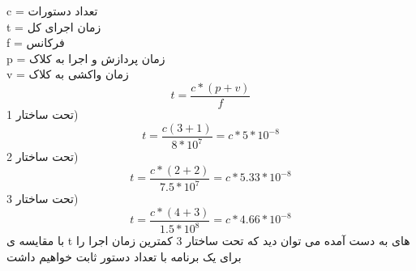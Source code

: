 c = تعداد دستورات\\
t = زمان اجرای کل\\
f = فرکانس\\
p = زمان پردازش و اجرا به کلاک\\
v = زمان واکشی به کلاک\\
\begin{equation*}
    t = \frac{c * (p + v)}{f}
\end{equation*}
تحت ساختار 1)\\
\begin{equation*}
    t = \frac{c ( 3 + 1)}{8 * 10^7} = c * 5 * 10^{-8} 
\end{equation*}
تحت ساختار 2)\\
\begin{equation*}
    t = \frac{c * (2 + 2)}{7.5 * 10^7} = c * 5.33 * 10^{-8}
\end{equation*}
تحت ساختار 3)\\
\begin{equation*}
    t = \frac{c * (4 + 3)}{1.5 * 10^8} = c * 4.66 * 10^{-8}
\end{equation*}
با مقایسه ی 
t
های به دست آمده می توان دید که تحت ساختار 3 کمترین زمان اجرا را برای یک برنامه با تعداد دستور ثابت خواهیم داشت
